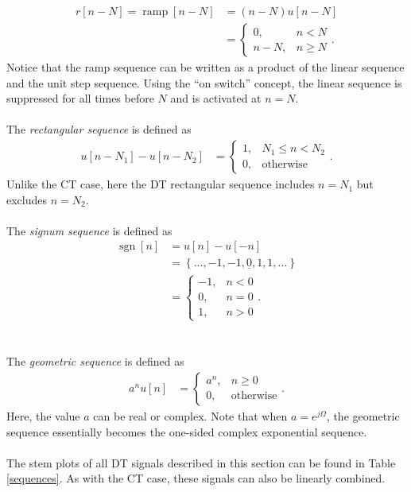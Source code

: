 \documentclass{report}
\begin{document}
\begin{align}
    r[n-N] = \operatorname{ramp}[n-N] &= (n-N)u[n-N] \\
    & =
    \begin{cases} 
        0, & n<N \\
        n-N, & n\geq N
    \end{cases}.
\end{align}
Notice that the ramp sequence can be written as a product of the linear sequence and the unit step sequence. Using the ``on switch'' concept, the linear sequence is suppressed 
for all times before $N$ and is activated at $n=N$.
\\ \\
The \emph{rectangular sequence} is defined as 
\begin{align}
    u[n-N_1] - u[n-N_2]
    &=
    \begin{cases} 
        1, & N_1 \leq n < N_2 \\
        0, & \text{otherwise}
    \end{cases}.
\end{align}
Unlike the CT case, here the DT rectangular sequence includes $n=N_1$ but excludes $n=N_2$.
\\ \\
The \emph{signum sequence} is defined as 
\begin{align}
    \operatorname{sgn}[n] &= u[n]-u[-n] \\ 
    &= \left\{...,-1,-1,\underline{0},1,1,...\right\} \\
    &=
    \begin{cases} 
        -1, & n<0 \\
        0, & n=0 \\
        1, & n>0
    \end{cases}.
\end{align}
\\ \\
The \emph{geometric sequence} is defined as 
\begin{align}
    a^n u[n]
    &=
    \begin{cases} 
        a^n, & n\geq 0 \\
        0, & \text{otherwise}
    \end{cases}.
\end{align}
Here, the value $a$ can be real or complex. Note that when $a=e^{j\Omega}$, the geometric sequence essentially becomes the 
one-sided complex exponential sequence.
\\ \\ 
The stem plots of all DT signals described in this section can be found in Table \ref{sequences}. As with the CT case, these signals 
can also be linearly combined.
\end{document}
